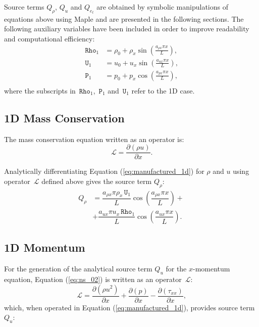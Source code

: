 \documentclass[10pt]{article}
\newcommand{\Diff}[2] {\dfrac{\partial( #1)}{\partial #2}}
\newcommand{\Rho}{\,\mathtt{Rho}}
\newcommand{\PP}{\,\mathtt{P}}
\newcommand{\U}{\,\mathtt{U}}
\newcommand{\Lo}{\,\mathcal{L}}
\begin{document}
Source terms $Q_\rho$, $Q_u$ and $Q_{e_t}$ are obtained by symbolic manipulations of equations above using Maple and are presented in the following sections. The following auxiliary variables have been included in order to improve readability and computational efficiency:
\begin{equation*}
 \begin{split}
\label{eq:aux_1d}
\Rho_1 &= \rho_{0}+ \rho_{x} \sin\left(\frac{a_{ \rho x} \pi x}{L}\right),\\
\U_1 &= u_{0}+u_{x} \sin\left(\frac{a_{u x} \pi x}{L}\right),\\
\PP_1 &= p_{0}+p_{x} \cos\left(\frac{a_{p x} \pi x}{L}\right),\\
\end{split}
\end{equation*}
where the subscripts in $\Rho_1$, $\PP_1$ and $\U_1$ refer to the 1D case.

\subsection{1D Mass Conservation}

The mass conservation equation written as an operator is:
\begin{equation*}
 \Lo= \Diff{\rho u}{x}.
\end{equation*}

Analytically differentiating Equation (\ref{eq:manufactured_1d}) for $\rho$ and $u$  using operator $\Lo$ defined above gives  the source term $Q_{\rho}$:
\begin{equation}
 \begin{split}
Q_\rho &= \dfrac{a_{\rho x} \pi \rho_x \U_1}{L}\cos\left(\dfrac{a_{\rho x} \pi x}{L}\right) +\\
&+\dfrac{a_{ux} \pi u_x \Rho_1}{L}\cos\left(\dfrac{a_{ux} \pi x}{L}\right) .
 \end{split}
\end{equation}


\subsection{1D Momentum}

For the generation of the analytical source term $Q_u$ for the $x$-momentum equation, Equation  (\ref{eq:ns_02}) is written as an  operator $\Lo$:
\begin{equation*}
 \Lo=\Diff{\rho u^2 }{x}+ \Diff{p}{x} -\Diff{\tau_{xx}}{x},
\end{equation*}
which, when operated in Equation (\ref{eq:manufactured_1d}), provides source term $Q_{u}$:
\end{document}
